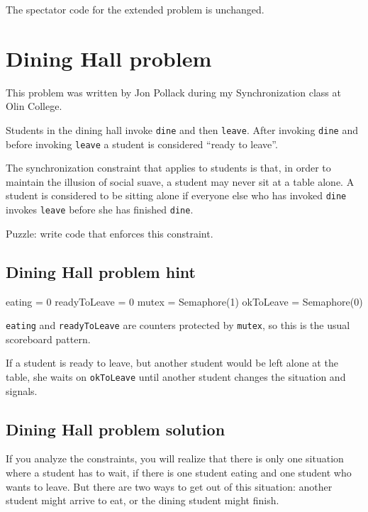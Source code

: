 \documentclass{book}
\begin{document}
The spectator code for the extended problem is unchanged.



\section{Dining Hall problem}

This problem was written by Jon Pollack during my Synchronization
class at Olin College.

Students in the dining hall invoke {\tt dine} and then {\tt leave}.
After invoking {\tt dine} and before invoking {\tt leave} a student is
considered ``ready to leave''.

The synchronization constraint that applies to students is that, in
order to maintain the illusion of social suave, a student may never
sit at a table alone.  A student is considered to be sitting alone
if everyone else who has invoked {\tt dine} invokes {\tt leave}
before she has finished {\tt dine}.

Puzzle: write code that enforces this constraint.



\subsection {Dining Hall problem hint}

\begin{unbreakable}[title={Dining Hall problem hint}]{}
eating = 0
readyToLeave = 0
mutex = Semaphore(1)
okToLeave = Semaphore(0)
\end{unbreakable}

{\tt eating} and {\tt readyToLeave} are
counters protected by {\tt mutex}, so this is the usual
scoreboard pattern.

If a student is ready to leave, but another student would be
left alone at the table, she waits on
    {\tt okToLeave} until another student changes
the situation and signals.



\subsection {Dining Hall problem solution}

If you analyze the constraints, you will realize that there
is only one situation where a student has to wait, if there is
one student eating and one student who wants to leave.  But
there are two ways to get out of this situation: another
student might arrive to eat, or the dining student might
finish.
\end{document}
